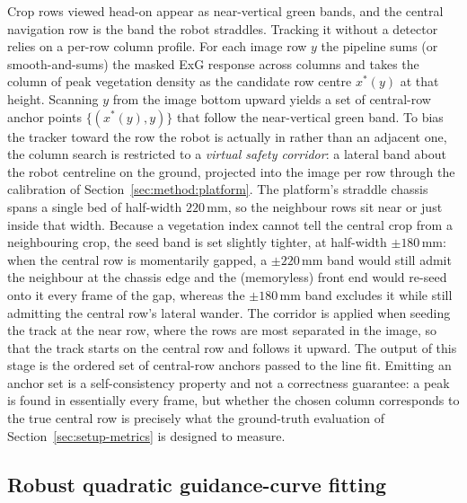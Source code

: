 Crop rows viewed head-on appear as near-vertical green bands, and the central navigation row is the band the
robot straddles. Tracking it without a detector relies on a per-row column profile. For each image row $y$ the
pipeline sums (or smooth-and-sums) the masked ExG response across columns and takes the column of peak
vegetation density as the candidate row centre $x^{\ast}(y)$ at that height. Scanning $y$ from the image
bottom upward yields a set of central-row anchor points $\{(x^{\ast}(y),y)\}$ that follow the near-vertical
green band. To bias the tracker toward the row the robot is actually in rather than an adjacent one, the
column search is restricted to a \emph{virtual safety corridor}: a lateral band about the robot centreline on
the ground, projected into the image per row through the calibration of Section~\ref{sec:method:platform}.
The platform's straddle chassis spans a single bed of half-width $220$\,mm, so the neighbour rows sit near or
just inside that width. Because a vegetation index cannot tell the central crop from a neighbouring crop, the
seed band is set slightly tighter, at half-width $\pm180$\,mm: when the central row is momentarily gapped, a
$\pm220$\,mm band would still admit the neighbour at the chassis edge and the (memoryless) front end would
re-seed onto it every frame of the gap, whereas the $\pm180$\,mm band excludes it while still admitting the
central row's lateral wander. The corridor is applied when seeding the track at the near row, where the rows
are most separated in the image, so that the track starts on the central row and follows it upward. The output of this
stage is the ordered set of central-row anchors passed to the line fit. Emitting an anchor set is a
self-consistency property and not a correctness guarantee: a peak is found in essentially every frame, but
whether the chosen column corresponds to the true central row is precisely what the ground-truth evaluation of
Section~\ref{sec:setup-metrics} is designed to measure.

\subsection{Robust quadratic guidance-curve fitting}
\label{sec:method:fit}

